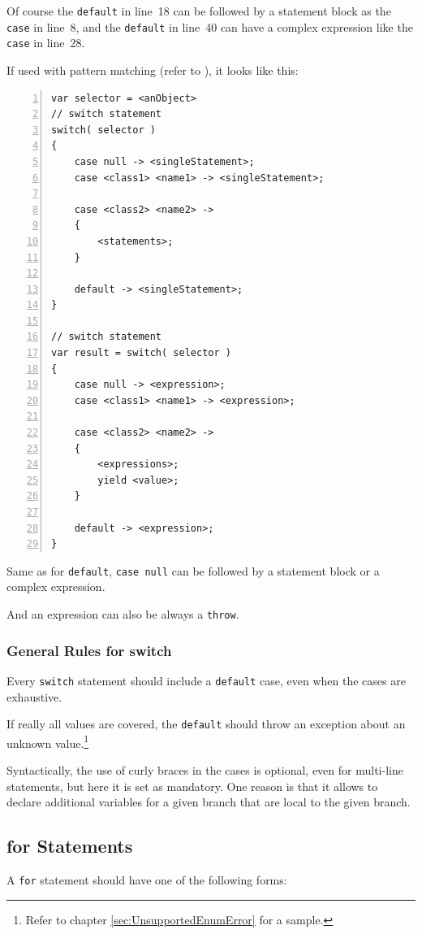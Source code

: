 \documentclass[12pt,a4paper,titlepage, parskip=half, headsepline, footsepline, cleardoubleplain]{scrbook}
\begin{document}
Of course the \lstinline|default| in line~18 can be followed by a statement block as the \lstinline|case| in line~8, and the \lstinline|default| in line~40 can have a complex expression like the \lstinline|case| in line~28.

If used with pattern matching (refer to \autocite{ORACLE_DOC_PATTERNMATCHING}), it looks like this:

\begin{lstlisting}[numbers=left]
var selector = <anObject>
// switch statement
switch( selector )
{
    case null -> <singleStatement>;
    case <class1> <name1> -> <singleStatement>;

    case <class2> <name2> ->
    {
        <statements>;
    }

    default -> <singleStatement>;
}

// switch statement
var result = switch( selector )
{
    case null -> <expression>;
    case <class1> <name1> -> <expression>;

    case <class2> <name2> ->
    {
        <expressions>;
        yield <value>;
    }

    default -> <expression>;
}
\end{lstlisting}

Same as for \lstinline|default|, \lstinline|case null| can be followed by a statement block or a complex expression.

And an expression can also be always a \lstinline|throw|.

\subsubsection{General Rules for switch}
Every \lstinline|switch| statement should include a \lstinline|default| case, even when the cases are exhaustive.

If really all values are covered, the \lstinline|default| should throw an exception about an unknown value.\footnote{Refer to chapter \ref{sec:UnsupportedEnumError} for a sample.}

Syntactically, the use of curly braces in the cases is optional, even for multi-line statements, but here it is set as mandatory. One reason is that it allows to declare additional variables for a given branch that are local to the given branch.

\subsection{for Statements}
A \lstinline|for| statement should have one of the following forms:
\end{document}
